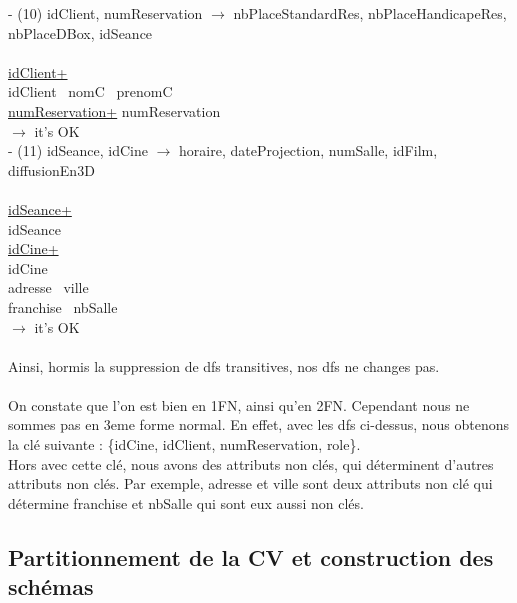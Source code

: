 \documentclass[a4paper,sffamily,12pt]{article}
\begin{document}
				\noindent - (10) idClient, numReservation $\rightarrow$ nbPlaceStandardRes, nbPlaceHandicapeRes, nbPlaceDBox, idSeance \\
					\\
					\underline{idClient+} \\
					idClient \ nomC \ prenomC \\
					\underline{numReservation+}
					numReservation \\									
				$\rightarrow$ it's OK \\		

				\noindent - (11) idSeance, idCine $\rightarrow$ horaire, dateProjection, numSalle, idFilm, diffusionEn3D \\
					\\
					\underline{idSeance+} \\
					idSeance \\
					\underline{idCine+}\\
					idCine \\ adresse \ ville \\ franchise \ nbSalle \\							
				$\rightarrow$ it's OK \\							
				\\		
				\noindent Ainsi, hormis la suppression de dfs transitives, nos dfs ne changes pas. \\																
				\\
				On constate que l'on est bien en 1FN, ainsi qu'en 2FN. Cependant nous ne sommes pas en 3eme forme normal. En effet, avec les dfs ci-dessus, nous obtenons la clé suivante : \{idCine, idClient, numReservation, role\}. \\
				Hors avec cette clé, nous avons des attributs non clés, qui déterminent d'autres attributs non clés. Par exemple, adresse et ville sont deux attributs non clé qui détermine franchise et nbSalle qui sont eux aussi non clés. \\
				
				\vspace{0.5cm}
													
			\subsection{Partitionnement de la CV et construction des schémas} 	
			
				\vspace{0.5cm}
			
\end{document}
